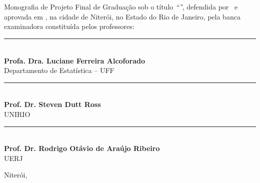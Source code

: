 \documentclass[12pt,a4paper,header]{abnt}
\begin{document}
\begin{folhadeaprovacao}

\thispagestyle{logouff}

\hspace{.2\textwidth} %
\begin{minipage}{.7\textwidth}

\begin{flushright}

{\large \bf \ABNTautordata}\\[1cm]

{\large \bf \ABNTtitulodata}\\[1cm]

\end{flushright}

Monografia de Projeto Final de Graduação sob o título \textit{``\ABNTtitulodata''},
defendida por \ABNTautordata~e aprovada em \ABNTdatadata, na cidade de Niterói,
no Estado do Rio de Janeiro, pela banca examinadora constituída pelos
professores:

\begin{flushright}

\begin{espacosimples}






\vspace{2cm}
\noindent\rule{8cm}{0.4pt}\\
{\bf Profa. Dra. Luciane Ferreira Alcoforado}\\
Departamento de Estatística -- UFF\\


\vspace{2cm}
\noindent\rule{8cm}{0.4pt}\\
{\bf Prof. Dr. Steven Dutt Ross}\\
UNIRIO\\


\vspace{2cm}
\noindent\rule{8cm}{0.4pt}\\
{\bf Prof. Dr. Rodrigo Otávio de Araújo Ribeiro}\\
UERJ\\

\end{espacosimples}

\end{flushright}

\vspace{2cm}
\hfill Niterói, \ABNTdatadata

\end{minipage}




\end{folhadeaprovacao}
\end{document}
